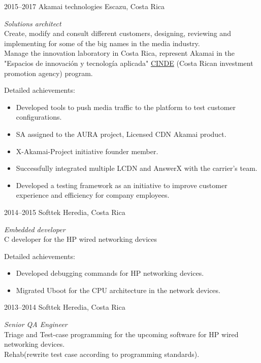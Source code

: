 \documentclass[]{friggeri-cv}
\begin{document}
\begin{entrylist}
\entry
{2015--2017}
{Akamai technologies}
{Escazu, Costa Rica}
{\emph{Solutions architect} \\
Create, modify and consult different customers, designing, reviewing and implementing for some of the big names in the media industry.\\
Manage the innovation laboratory in Costa Rica, represent Akamai in the "Espacios de innovación y tecnología aplicada" \href{https://www.cinde.org/}{CINDE} (Costa Rican investment promotion agency) program.

Detailed achievements:
\begin{itemize}
	\item Developed tools to push media traffic to the platform to test customer configurations.
	\item SA assigned to the AURA project, Licensed CDN Akamai product.
	\item X-Akamai-Project initiative founder member.
	\item Successfully integrated multiple LCDN and AnswerX with the carrier's team.
	\item Developed a testing framework as an initiative to improve customer experience and efficiency for company employees.
\end{itemize}
}

\entry
{2014--2015}
{Softtek}
{Heredia, Costa Rica}
{\emph{Embedded developer} \\
C developer for the HP wired networking devices

Detailed achievements:
\begin{itemize}
\item Developed debugging commands for HP networking devices.
\item Migrated Uboot for the CPU architecture in the network devices.
\end{itemize}
}

\entry
{2013--2014}
{Softtek}
{Heredia, Costa Rica}
{\emph{Senior QA Engineer} \\
Triage and Test-case programming for the upcoming software for HP wired networking devices.\\
Rehab(rewrite test case according to programming standards).

}
\end{entrylist}
\end{document}
